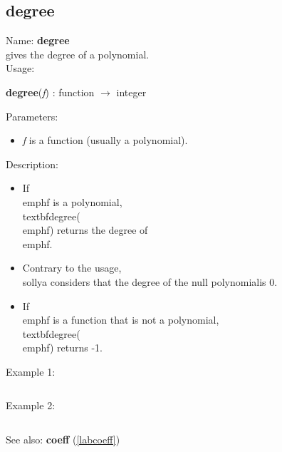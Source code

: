 \subsection{degree}
\label{labdegree}
\noindent Name: \textbf{degree}\\
gives the degree of a polynomial.\\
\noindent Usage: 
\begin{center}
\textbf{degree}(\emph{f}) : \textsf{function} $\rightarrow$ \textsf{integer}\\
\end{center}
Parameters: 
\begin{itemize}
\item \emph{f} is a function (usually a polynomial).
\end{itemize}
\noindent Description: \begin{itemize}

\item If \\emph{f} is a polynomial, \\textbf{degree}(\\emph{f}) returns the degree of \\emph{f}.\n
\item Contrary to the usage, \\sollya considers that the degree of the null polynomial\n   is 0.\n
\item If \\emph{f} is a function that is not a polynomial, \\textbf{degree}(\\emph{f}) returns -1.\n\end{itemize}
\noindent Example 1: 
\begin{center}\begin{minipage}{15cm}\begin{Verbatim}[frame=single]
\end{Verbatim}
\end{minipage}\end{center}
\noindent Example 2: 
\begin{center}\begin{minipage}{15cm}\begin{Verbatim}[frame=single]
\end{Verbatim}
\end{minipage}\end{center}
See also: \textbf{coeff} (\ref{labcoeff})
